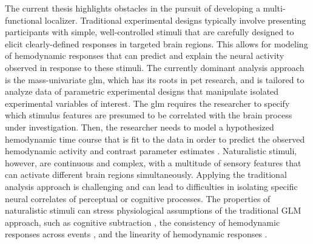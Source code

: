 %
The current thesis highlights obstacles in the pursuit of developing a
multi-functional localizer.
%
Traditional experimental designs typically involve presenting participants with
simple, well-controlled stimuli that are carefully designed to elicit
clearly-defined responses in targeted brain regions.
%
This allows for modeling of hemodynamic responses that can predict and explain
the neural activity observed in response to these stimuli.
%
The currently dominant analysis approach is the mass-univariate \ac{glm}, which
has its roots in \ac{pet} research, and is tailored to analyze data of
parametric experimental designs that manipulate isolated experimental variables
of interest.
%
The \ac{glm} requires the researcher to specify which stimulus features are
presumed to be correlated with the brain process under investigation.
%
Then, the researcher needs to model a hypothesized hemodynamic time course that
is fit to the data in order to predict the observed hemodynamic activity and
contrast parameter estimates \citep{friston1998event}.
%
Naturalistic stimuli, however, are continuous and complex, with a multitude of
sensory features that can activate different brain regions simultaneously.
%
Applying the traditional analysis approach is challenging and can lead to
difficulties in isolating specific neural correlates of perceptual or cognitive
processes.
%
The properties of naturalistic stimuli can stress physiological assumptions of
the traditional GLM approach, such as cognitive subtraction
\citep{friston1996trouble}, the consistency of hemodynamic responses across
events \citep[the rationale behind \textit{trial-averaging};
cf.][]{dale1997selective}, and the linearity of hemodynamic responses
\citep{cohen1997parametric, boynton1996linear, dale1999optimal}.  

